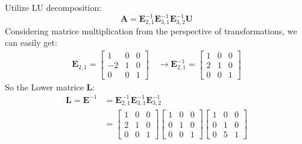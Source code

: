         Utilize LU decomposition:
            \begin{equation}
                \mathbf{A} = \mathbf{E}_{2,1}^{-1} \mathbf{E}_{3,1}^{-1} \mathbf{E}_{3,2}^{-1} \mathbf{U}
            \end{equation}
        Considering matrice multiplication from the perspective of transformations, we can easily get:
            \begin{equation}
                \begin{aligned}
                \mathbf{E}_{2,1} = 
                        \begin{bmatrix}
                            1 & 0 & 0\\
                            \boxed{-2} & 1 & 0\\
                            0 & 0 & 1
                        \end{bmatrix} \quad \rightarrow
                \mathbf{E}_{2,1}^{-1} = 
                        \begin{bmatrix}
                            1 & 0 & 0\\
                            \boxed{2} & 1 & 0\\
                            0 & 0 & 1
                        \end{bmatrix}
                \end{aligned}
            \end{equation}
        So the Lower matrice \textbf{L}:
            \begin{equation}
                \begin{aligned}
                \mathbf{L} = \mathbf{E}^{-1} &= \mathbf{E}_{2,1}^{-1} \mathbf{E}_{3,1}^{-1} \mathbf{E}_{3,2}^{-1}\\
                        &= 
                        \begin{bmatrix}
                            1 & 0 & 0\\
                            2 & 1 & 0\\
                            0 & 0 & 1
                        \end{bmatrix}
                        \begin{bmatrix}
                            1 & 0 & 0\\
                            0 & 1 & 0\\
                            0 & 0 & 1
                        \end{bmatrix}
                        \begin{bmatrix}
                            1 & 0 & 0\\
                            0 & 1 & 0\\
                            0 & 5 & 1
                        \end{bmatrix}
            \end{aligned}
            \end{equation}
